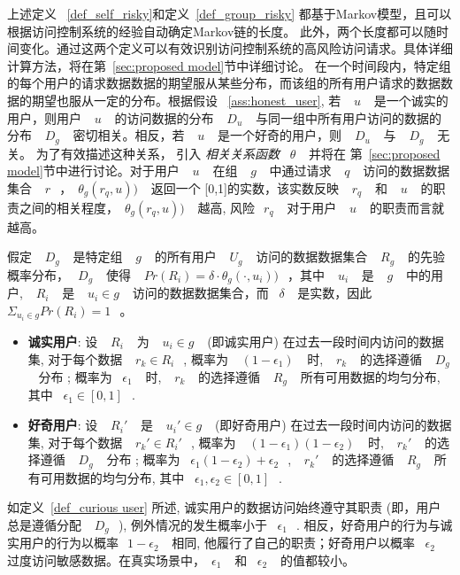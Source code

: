 上述定义 ~\ref{def_self_risky}和定义~\ref{def_group_risky} 都基于Markov模型，且可以根据访问控制系统的经验自动确定Markov链的长度。 此外，两个长度都可以随时间变化。通过这两个定义可以有效识别访问控制系统的高风险访问请求。具体详细计算方法，将在第~\ref{sec:proposed model}节中详细讨论。 在一个时间段内，特定组的每个用户的请求数据数据的期望服从某些分布，而该组的所有用户请求的数据数据的期望也服从一定的分布。根据假设 ~\ref{ass:honest_user}, 若 ~$~u~$~ 是一个诚实的用户，则用户 ~$~u~$~ 的访问数据的分布 ~$~D_u~$~ 与同一组中所有用户访问的数据的分布 ~$~D_g~$~ 密切相关。相反，若 ~$~u~$~ 是一个好奇的用户，则 ~$~D_u~$~ 与 ~$~D_g~$~ 无关。 为了有效描述这种关系， 引入 \emph{相关关系函数} ~$\theta~$~ 并将在 第~\ref{sec:proposed model}节中进行讨论。对于用户 ~$~u~$~ 在组 ~$~g~$~ 中通过请求 ~$~q~$~ 访问的数据数据集合 ~$~r~$~，~$\theta_g (r_q,u))~$~ 返回一个 [0,1]的实数，该实数反映 ~$~r_q~$~ 和 ~$~u~$~ 的职责之间的相关程度，~$\theta_g (r_q,u))~$~ 越高, 风险~$~r_q~$~ 对于用户 ~$~u~$~ 的职责而言就越高。


\begin{definition}%
	\label{def_curious user}
	假定 ~$~D_g~$~ 是特定组 ~$~g~$~ 的所有用户 ~$~U_g~$~ 访问的数据数据集合 ~$~R_g~$~ 的先验概率分布，~$~D_g~$~ 使得 ~$~Pr(R_i)=\delta \cdot \theta_g (\cdot,u_i))~$~，其中 ~$~u_i~$~ 是 ~$~g~$~ 中的用户, ~$~R_i~$~ 是 ~$~u_i \in g~$~ 访问的数据数据集合，而 ~$\delta~$~ 是实数，因此 ~$\Sigma_{u_i \in g}Pr(R_i) = 1~$~。
	\begin{itemize}
		\item \textbf{诚实用户}: 设 ~$~R_i~$~ 为 ~$~u_i \in g~$~ (即诚实用户) 在过去一段时间内访问的数据集, 对于每个数据 ~$~r_k \in R_i~$~, 概率为 ~$~(1-\epsilon_1)~$~ 时,  ~$~r_k~$~ 的选择遵循 ~$~D_g~$~ 分布 ; 概率为 ~$\epsilon_1~$~ 时,  ~$~r_k~$~ 的选择遵循 ~$~R_g~$~ 所有可用数据的均匀分布, 其中 ~$\epsilon_1 \in [0,1]~$~.
		\item \textbf{好奇用户}: 设 ~$~R_i'~$~ 是 ~$~u_i' \in g~$~ (即好奇用户) 在过去一段时间内访问的数据集, 对于每个数据 ~$~r_k' \in R_i'~$~, 概率为 ~$~(1-\epsilon_1)(1-\epsilon_2)~$~ 时,  ~$~r_k'~$~ 的选择遵循 ~$~D_g~$~ 分布 ; 概率为 ~$\epsilon_1 (1 - \epsilon_2)+ \epsilon_2~$~,  ~$~r_k'~$~ 的选择遵循 ~$~R_g~$~ 所有可用数据的均匀分布, 其中 ~$\epsilon_1, \epsilon_2 \in [0,1]~$~.
	\end{itemize}
\end{definition}

如定义~\ref{def_curious user} 所述, 诚实用户的数据访问始终遵守其职责 (即，用户总是遵循分配 ~$~D_g~$~), 例外情况的发生概率小于 ~$\epsilon_1~$~. 相反，好奇用户的行为与诚实用户的行为以概率~$~1-\epsilon_2~$~ 相同, 他履行了自己的职责；好奇用户以概率 ~$\epsilon_2~$~ 过度访问敏感数据。在真实场景中，~$\epsilon_1~$~ 和 ~$\epsilon_2~$~ 的值都较小。

